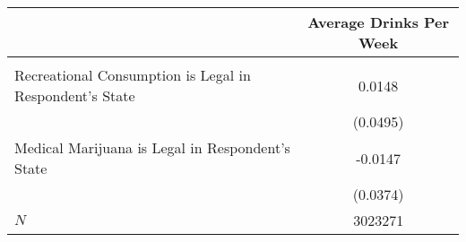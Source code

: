 \begin{tabular}{l*{1}{c}}
\hline\hline
            &\multicolumn{1}{c}{Average Drinks Per Week}\\
\hline
&            \\
Recreational Consumption is Legal in Respondent's State       &      0.0148\\
            &     (0.0495)\\
[1em]
Medical Marijuana is Legal in Respondent's State         &       -0.0147\\
            &     (0.0374)\\
\hline
\(N\)       &     3023271\\
\hline\hline
\end{tabular}
